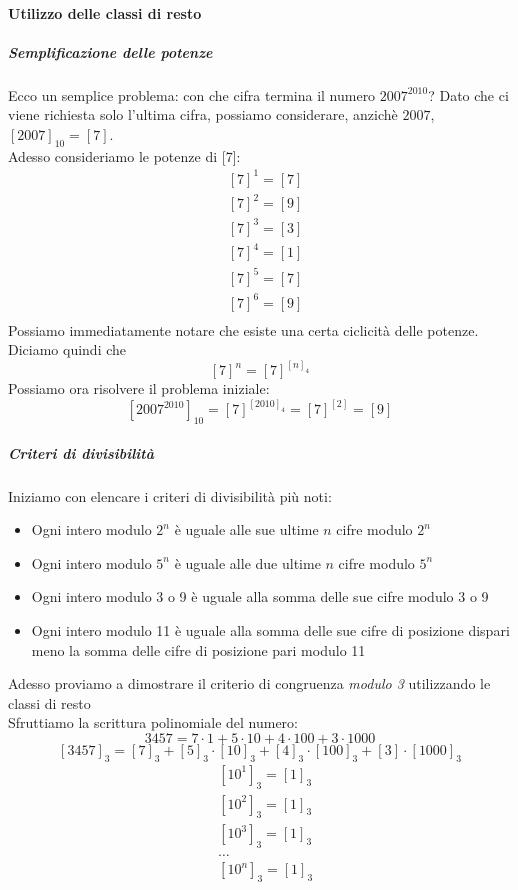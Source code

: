 \documentclass[12pt, a4paper,oneside]{report}
\begin{document}
	\paragraph{Utilizzo delle classi di resto}
	\subparagraph{Semplificazione delle potenze}
	Ecco un semplice problema: con che cifra termina il numero $2007^{2010}$? 
	Dato che ci viene richiesta solo l'ultima cifra, possiamo considerare, anzichè $2007$, $[2007]_{10}=[7]$.\\
	Adesso consideriamo le potenze di [7]:
	\begin{align*}
	&[7]^1=[7]\\
	&[7]^2=[9]\\
	&[7]^3=[3]\\
	&[7]^4=[1]\\
	&[7]^5=[7]\\
	&[7]^6=[9]\\
	\end{align*}
	Possiamo immediatamente notare che esiste una certa ciclicità delle potenze.\\
	Diciamo quindi che 
	\[
	[7]^n=[7]^{[n]_4}
	\]
	Possiamo ora risolvere il problema iniziale: 
	\[[2007^{2010}]_{10}=[7]^{[2010]_4}=[7]^{[2]}=[9]\]
	\subparagraph{Criteri di divisibilità}
	Iniziamo con elencare i criteri di divisibilità più noti:
	\begin{itemize}
		\item Ogni intero modulo $2^n$ è uguale alle sue ultime $n$ cifre modulo $2^n$
		\item Ogni intero modulo $5^n$ è uguale alle due ultime $n$ cifre modulo $5^n$
		\item Ogni intero modulo 3 o 9 è uguale alla somma delle sue cifre modulo 3 o 9
		\item Ogni intero modulo 11 è uguale alla somma delle sue cifre di posizione dispari meno la somma delle cifre di posizione pari modulo 11
	\end{itemize}
	Adesso proviamo a dimostrare il criterio di congruenza \emph{modulo 3} utilizzando le classi di resto\\
	Sfruttiamo la scrittura polinomiale del numero:
	\[3457=7\cdot1+5\cdot10+4\cdot100+3\cdot1000\]
	\[[3457]_3=[7]_3+[5]_3\cdot[10]_3+[4]_3\cdot[100]_3+[3]\cdot[1000]_3\]
	\begin{align*}
	&[10^1]_3=[1]_3\\&[10^2]_3=[1]_3\\&[10^3]_3=[1]_3\\&\dots\\&[10^n]_3=[1]_3\\
	\end{align*}
\end{document}
